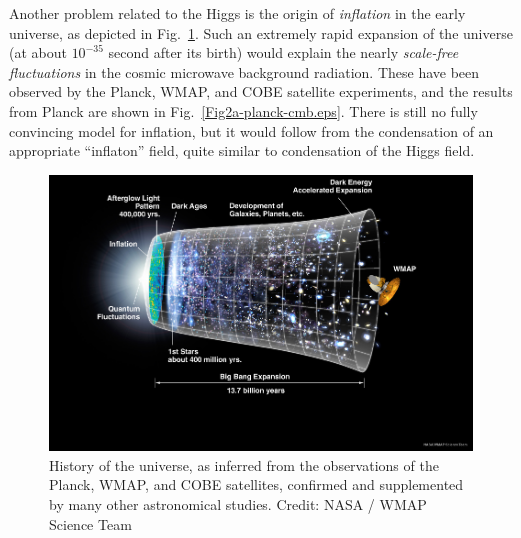 \documentclass[12pt]{iopart}
\begin{document}
Another problem related to the Higgs is the origin of \textit{inflation} in the early universe, as depicted in  Fig.~\ref{Fig2b-CMB_Timeline.eps}. Such an extremely rapid expansion of the universe (at about $10^{-35}$ second after its birth) would explain the nearly \textit{scale-free fluctuations} in the cosmic microwave background radiation. These have been observed by the Planck, WMAP, and COBE satellite experiments, and the results from Planck are shown in Fig.~\ref{Fig2a-planck-cmb.eps}. There is still no fully convincing model for inflation, but it would follow from the condensation of an appropriate ``inflaton'' field, quite similar to condensation of the Higgs field.
\begin{figure}[htbp]
\centering
 \includegraphics[bb=0 0 360 260, width=5in]{Fig2b-CMB_Timeline.eps}
 \caption{History of the universe, as inferred from the observations of the Planck, WMAP, and COBE satellites, confirmed and supplemented by many other astronomical studies. Credit: NASA / WMAP Science Team \label{Fig2b-CMB_Timeline.eps}}
 \end{figure}
\end{document}
